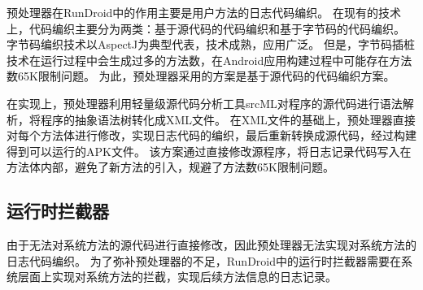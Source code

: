 预处理器在RunDroid中的作用主要是用户方法的日志代码编织。
在现有的技术上，代码编织主要分为两类：基于源代码的代码编织和基于字节码的代码编织。
字节码编织技术以AspectJ\cite{TheAspecJ}为典型代表，技术成熟，应用广泛。
但是，字节码插桩技术在运行过程中会生成过多的方法数，在Android应用构建过程中可能存在方法数65K限制问题。
为此，预处理器采用的方案是基于源代码的代码编织方案。

在实现上，预处理器利用轻量级源代码分析工具srcML\cite{collard2013srcml}对程序的源代码进行语法解析，将程序的抽象语法树转化成XML文件。
在XML文件的基础上，预处理器直接对每个方法体进行修改，实现日志代码的编织，最后重新转换成源代码，经过构建得到可以运行的APK文件。
该方案通过直接修改源程序，将日志记录代码写入在方法体内部，避免了新方法的引入，规避了方法数65K限制问题。


\subsection{运行时拦截器}%

由于无法对系统方法的源代码进行直接修改，因此预处理器无法实现对系统方法的日志代码编织。
为了弥补预处理器的不足，RunDroid中的运行时拦截器需要在系统层面上实现对系统方法的拦截，实现后续方法信息的日志记录。





